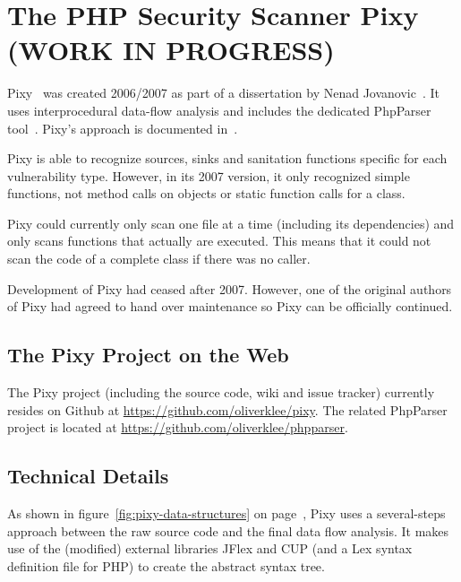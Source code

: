 \chapter{The PHP Security Scanner Pixy (WORK IN PROGRESS)}
\label{pixy}
Pixy~\cite{pixy} was created 2006/2007 as part of a dissertation by Nenad Jovanovic~\cite{pixy-dissertation}. It uses interprocedural data-flow analysis and includes the dedicated PhpParser tool~\cite{phpparser}. Pixy's approach is documented in~\cite{pixy-short, pixy-long, pixy-technical, pixy-dissertation}.

Pixy is able to recognize sources, sinks and sanitation functions specific for each vulnerability type. However, in its 2007 version, it only recognized simple functions, not method calls on objects or static function calls for a class.

Pixy could currently only scan one file at a time (including its dependencies) and only scans functions that actually are executed. This means that it could not scan the code of a complete class if there was no caller.

Development of Pixy had ceased after 2007. However, one of the original authors of Pixy had agreed to hand over maintenance so Pixy can be officially continued.

\section{The Pixy Project on the Web}

The Pixy project (including the source code, wiki and issue tracker) currently resides on Github at \url{https://github.com/oliverklee/pixy}. The related PhpParser project is located at \url{https://github.com/oliverklee/phpparser}.

\section{Technical Details}

As shown in figure~\ref{fig:pixy-data-structures} on page~\pageref{fig:pixy-data-structures}, Pixy uses a several-steps approach between the raw source code and the final data flow analysis. It makes use of the (modified) external libraries JFlex and CUP (and a Lex syntax definition file for PHP) to create the abstract syntax tree.

